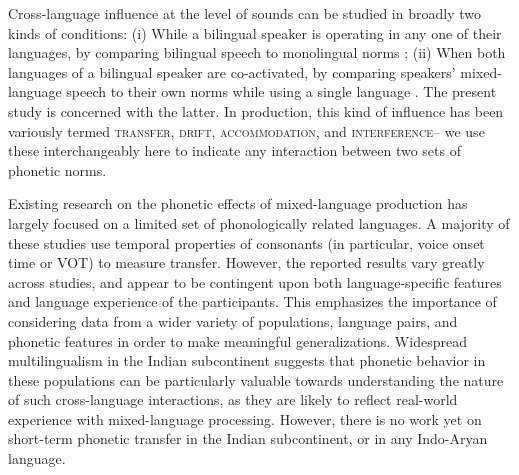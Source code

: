 \documentclass[12 pt]{article}
\begin{document}
Cross-language influence at the level of sounds can be studied in broadly two kinds of conditions:
(i) While a bilingual speaker is operating in any one of their languages, by comparing bilingual speech to monolingual norms \citep[e.g.][]{guion2003vowel,caramazza1973acquisition,flege1987production}; %
(ii) When both languages of a bilingual speaker are co-activated, by comparing speakers' mixed-language speech to their own norms while using a single language \citep[e.g.][]{grosjean1994going, bullock2009trying,elias2017effects, simonet2014phonetic}. %
The present study is concerned with the latter. In production, this kind of influence has been variously termed \textsc{transfer, drift, accommodation,} and \textsc{interference}-- we use these interchangeably here to indicate any interaction between two sets of phonetic norms.

Existing research on the phonetic effects of mixed-language production has largely focused on a limited set of phonologically related languages. A majority of these studies use temporal properties of consonants (in particular, voice onset time or VOT) to measure transfer. However, the reported results vary greatly across studies, and appear to be contingent upon both language-specific features and language experience of the participants. This emphasizes the importance of considering data from a wider variety of
populations, language pairs,  and phonetic features in order to make meaningful generalizations. Widespread multilingualism in the Indian subcontinent suggests that phonetic
behavior in these populations can be particularly valuable towards understanding the nature of such cross-language interactions, as they are likely to reflect real-world experience with mixed-language processing. However, there is no work yet on short-term phonetic transfer in the Indian subcontinent, or in any Indo-Aryan language. 
\end{document}
